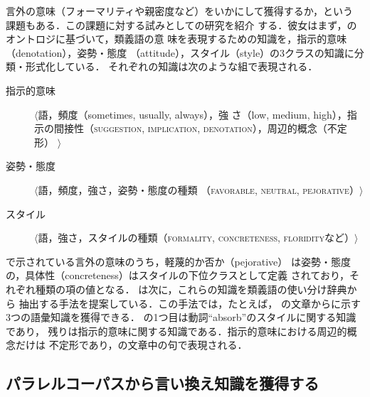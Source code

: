 言外の意味（フォーマリティや親密度など）をいかにして獲得するか，という
課題もある．この課題に対する試みとしての研究を紹介
する．彼女はまず，のオントロジに基づいて，類義語の意
味を表現するための知識を，指示的意味（denotation），姿勢・態度
（attitude），スタイル（style）の3クラスの知識に分類・形式化している．
それぞれの知識は次のような組で表現される．
\medskip
\begin{description}
\item[指示的意味] $\langle$語，頻度（sometimes, usually, always），強
さ（low, medium, high），指示の間接性（\textsc{suggestion}, 
\textsc{implication}, \textsc{denotation}），周辺的概念（不定形）
$\rangle$
\item[姿勢・態度] $\langle$語，頻度，強さ，姿勢・態度の種類
（\textsc{favorable}, \textsc{neutral}, \textsc{pejorative}）$\rangle$
\item[スタイル] $\langle$語，強さ，スタイルの種類（\textsc{formality}, 
\textsc{concreteness}, \textsc{floridity}など）$\rangle$
\end{description}
\medskip
{}で示されている言外の意味のうち，軽蔑的か否か（pejorative）
は姿勢・態度の，具体性（concreteness）はスタイルの下位クラスとして定義
されており，それぞれ種類の項の値となる．
\citeauthor{inkpen:03:b}は次に，これらの知識を類義語の使い分け辞典から
抽出する手法を提案している．この手法では，たとえば，
の文章からに示す3つの語彙知識を獲得できる．
の1つ目は動詞``absorb''のスタイルに関する知識であり，
残りは指示的意味に関する知識である．指示的意味における周辺的概念だけは
不定形であり，の文章中の句で表現される．


\subsection{パラレルコーパスから言い換え知識を獲得する}
\label{sssec:extraction}

